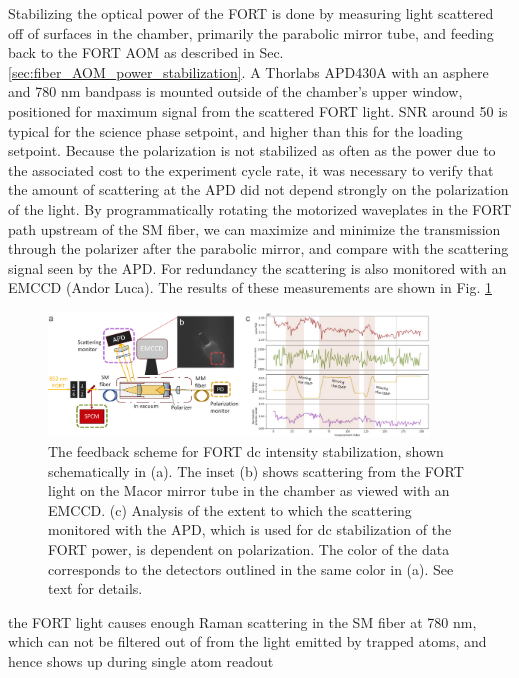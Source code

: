 Stabilizing the optical power of the FORT is done by measuring light scattered off of surfaces in the chamber, primarily the parabolic mirror tube, and feeding back to the FORT AOM as described in Sec. \ref{sec:fiber_AOM_power_stabilization}. A Thorlabs APD430A with an asphere and 780 nm bandpass is mounted outside of the chamber's upper window, positioned for maximum signal from the scattered FORT light. SNR around 50 is typical for the science phase setpoint, and higher than this for the loading setpoint. Because the polarization is not stabilized as often as the power due to the associated cost to the experiment cycle rate, it was necessary to verify that the amount of scattering at the APD did not depend strongly on the polarization of the light. By programmatically rotating the motorized waveplates in the FORT path upstream of the SM fiber, we can maximize and minimize the transmission through the polarizer after the parabolic mirror, and compare with the scattering signal seen by the APD. For redundancy the scattering is also monitored with an EMCCD (Andor Luca). The results of these measurements are shown in Fig. \ref{fig:FORTfeedback}

\begin{figure}[!ht]
    \centering
    \includegraphics[width=0.9\textwidth]{Images/FORT_feedback.pdf}
    \caption{The feedback scheme for FORT dc intensity stabilization, shown schematically in (a). The inset (b) shows scattering from the FORT light on the Macor mirror tube in the chamber as viewed with an EMCCD. (c) Analysis of the extent to which the scattering monitored with the APD, which is used for dc stabilization of the FORT power, is dependent on polarization. The color of the data corresponds to the detectors outlined in the same color in (a). See text for details.}
    \label{fig:FORTfeedback}
\end{figure}

the FORT light causes enough Raman scattering in the SM fiber at 780 nm, which can not be filtered out of from the light emitted by trapped atoms, and hence shows up during single atom readout

